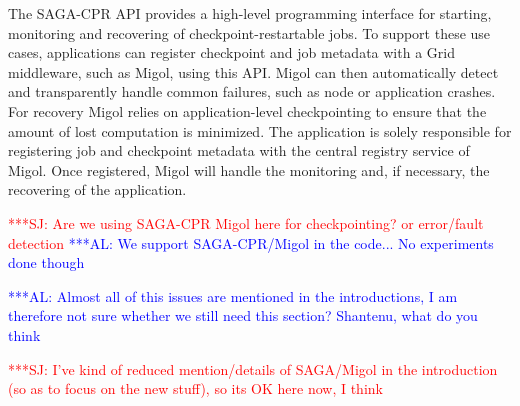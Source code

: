 \documentclass{rspublic}
\newcommand{\alnote}[1]{ {\textcolor{blue} { ***AL: #1 }}}
\newcommand{\jhanote}[1]{ {\textcolor{red} { ***SJ: #1 }}}
\newcommand{\alnote}[1]{}
\newcommand{\jhanote}[1]{}
\begin{document}

The SAGA-CPR API provides a high-level programming interface for
starting, monitoring and recovering of checkpoint-restartable jobs. To
support these use cases, applications can register checkpoint and job
metadata with a Grid middleware, such as Migol, using this API.  Migol
can then automatically detect and transparently handle common
failures, such as node or application crashes. For recovery Migol
relies on application-level checkpointing to ensure that the amount of
lost computation is minimized. The application is solely responsible
for registering job and checkpoint metadata with the central registry
service of Migol. Once registered, Migol will handle the monitoring
and, if necessary, the recovering of the application.








\jhanote{Are we using SAGA-CPR Migol here for checkpointing? or
  error/fault detection} 
\alnote{We support SAGA-CPR/Migol in the code... No experiments done though}  

\alnote{Almost all of this issues are mentioned in the introductions,
  I am therefore not sure whether we still need this section?
  Shantenu, what do you think}

\jhanote{I've kind of reduced mention/details of SAGA/Migol in the
  introduction (so as to focus on the new stuff), so its OK here now,
  I think}
\end{document}
